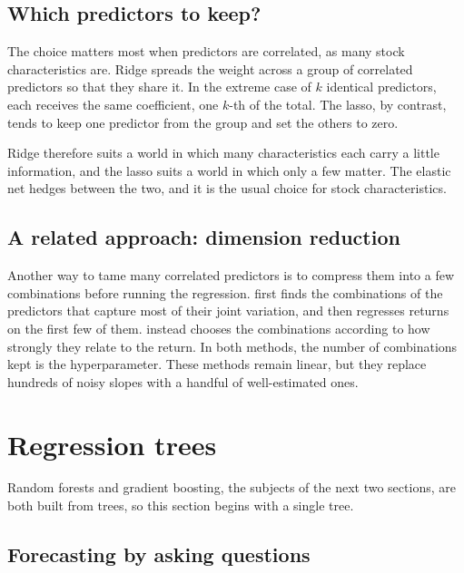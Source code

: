 \subsection{Which predictors to keep?}

The choice matters most when predictors are correlated, as many stock characteristics are. Ridge spreads the weight across a group of correlated predictors so that they share it. In the extreme case of $k$ identical predictors, each receives the same coefficient, one $k$-th of the total. The lasso, by contrast, tends to keep one predictor from the group and set the others to zero.

Ridge therefore suits a world in which many characteristics each carry a little information, and the lasso suits a world in which only a few matter. The elastic net hedges between the two, and it is the usual choice for stock characteristics.

\subsection{A related approach: dimension reduction}

Another way to tame many correlated predictors is to compress them into a few combinations before running the regression.  first finds the combinations of the predictors that capture most of their joint variation, and then regresses returns on the first few of them.  instead chooses the combinations according to how strongly they relate to the return. In both methods, the number of combinations kept is the hyperparameter. These methods remain linear, but they replace hundreds of noisy slopes with a handful of well-estimated ones.

\section{Regression trees}
\label{sec:20-trees}

Random forests and gradient boosting, the subjects of the next two sections, are both built from trees, so this section begins with a single tree.

\subsection{Forecasting by asking questions}

